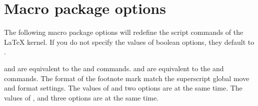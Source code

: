 \documentclass[load-preamble+]{cnltx-doc}
\begin{document}
\section{Macro package options}
\label{sec:macro package options}
The following macro package options will redefine the script commands of the \LaTeX{} kernel. If you do not specify the values of boolean options, they default to .
\begin{options}
   and  are equivalent to the  and  commands.
   and  are equivalent to the  and  commands.
  The format of the footnote mark match the superscript global move and format settings.
  The values of  and  two options are  at the same time.
  The values of ,  and  three options are  at the same time.
  \begin{example}
  \usepackage[both]{spbmark}
  \usepackage[text,foot=true]{spbmark}
  \end{example}
\end{options}
\end{document}
